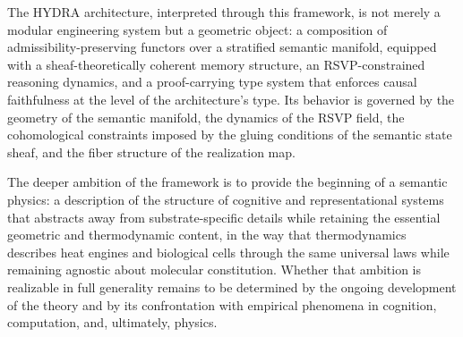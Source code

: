 \documentclass[12pt, a4paper, openany]{book}
\theoremstyle{plain}
\theoremstyle{definition}
\theoremstyle{remark}
\begin{document}
The HYDRA architecture, interpreted through this framework, is not merely a modular engineering system but a geometric object: a composition of admissibility-preserving functors over a stratified semantic manifold, equipped with a sheaf-theoretically coherent memory structure, an RSVP-constrained reasoning dynamics, and a proof-carrying type system that enforces causal faithfulness at the level of the architecture's type. Its behavior is governed by the geometry of the semantic manifold, the dynamics of the RSVP field, the cohomological constraints imposed by the gluing conditions of the semantic state sheaf, and the fiber structure of the realization map.

The deeper ambition of the framework is to provide the beginning of a semantic physics: a description of the structure of cognitive and representational systems that abstracts away from substrate-specific details while retaining the essential geometric and thermodynamic content, in the way that thermodynamics describes heat engines and biological cells through the same universal laws while remaining agnostic about molecular constitution. Whether that ambition is realizable in full generality remains to be determined by the ongoing development of the theory and by its confrontation with empirical phenomena in cognition, computation, and, ultimately, physics.
\end{document}
